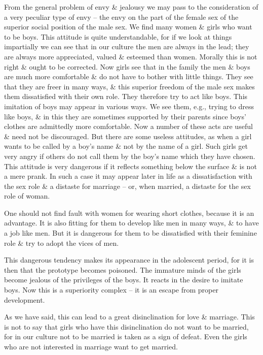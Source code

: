 \documentclass{article}
\numberwithin{equation}{section}
\begin{document}
From the general problem of envy \& jealousy we may pass to the consideration of a very peculiar type of envy -- the envy on the part of the female sex of the superior social position of the male sex. We find many women \& girls who want to be boys. This attitude is quite understandable, for if we look at things impartially we can see that in our culture the men are always in the lead; they are always more appreciated, valued \& esteemed than women. Morally this is not right \& ought to be corrected. Now girls see that in the family the men \& boys are much more comfortable \& do not have to bother with little things. They see that they are freer in many ways, \& this superior freedom of the male sex makes them dissatisfied with their own role. They therefore try to act like boys. This imitation of boys may appear in various ways. We see them, e.g., trying to dress like boys, \& in this they are sometimes supported by their parents since boys' clothes are admittedly more comfortable. Now a number of these acts are useful \& need not be discouraged. But there are some useless attitudes, as when a girl wants to be called by a boy's name \& not by the name of a girl. Such girls get very angry if others do not call them by the boy's name which they have chosen. This attitude is very dangerous if it reflects something below the surface \& is not a mere prank. In such a case it may appear later in life as a dissatisfaction with the sex role \& a distaste for marriage -- or, when married, a distaste for the sex role of woman.

One should not find fault with women for wearing short clothes, because it is an advantage. It is also fitting for them to develop like men in many ways, \& to have a job like men. But it is dangerous for them to be dissatisfied with their feminine role \& try to adopt the vices of men.

This dangerous tendency makes its appearance in the adolescent period, for it is then that the prototype becomes poisoned. The immature minds of the girls become jealous of the privileges of the boys. It reacts in the desire to imitate boys. Now this is a superiority complex -- it is an escape from proper development.

As we have said, this can lead to a great disinclination for love \& marriage. This is not to say that girls who have this disinclination do not want to be married, for in our culture not to be married is taken as a sign of defeat. Even the girls who are not interested in marriage want to get married.
\end{document}

